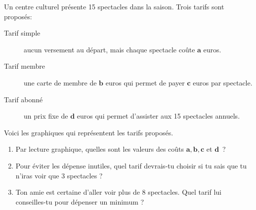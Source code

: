 %
%
    Un centre culturel présente 15 spectacles dans la saison.
    Trois tarifs sont proposés:
    \begin{description}
        \item[Tarif simple] aucun versement au départ, mais chaque spectacle coûte $\bm{a}$ euros.
        \item[Tarif membre] une carte de membre de $\bm{b}$ euros qui permet de payer $\bm{c}$ euros par spectacle.
        \item[Tarif abonné] un prix fixe de $\bm{d}$ euros qui permet d'assister aux 15 spectacles annuels.
    \end{description}
    Voici les graphiques qui représentent les tarifs proposés.
    \begin{center}
        
    \end{center}
    \begin{enumerate}
        \item Par lecture graphique, quelles sont les valeurs des coûts $\bm{a}, \bm{b}, \bm{c}$ et $\bm{d}$~?
        \item Pour éviter les dépense inutiles, quel tarif devrais-tu choisir si tu sais que tu n'iras voir que 3 spectacles ?
        \item Ton amie est certaine d'aller voir plus de 8 spectacles. Quel tarif lui conseilles-tu pour dépenser un minimum ?
    \end{enumerate}
